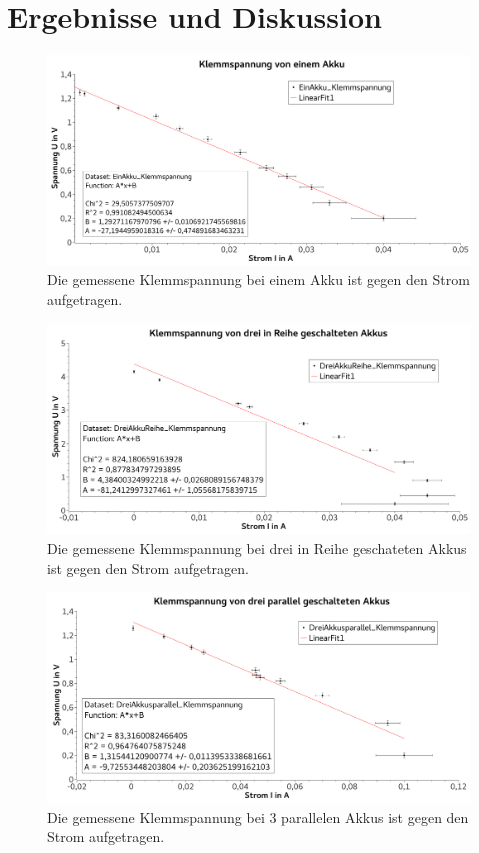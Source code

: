 \documentclass[
	a4paper,
	12pt,
	pagesize,
	ngerman
]{scrartcl}
\begin{document}
	\section{Ergebnisse und Diskussion}
	\begin{figure}[tb]
		\includegraphics[width=1\textwidth]{Spannung1}
		\centering
		\caption{Die gemessene Klemmspannung bei einem Akku ist gegen den Strom aufgetragen.}
		\label{Spannung1}
		\centering
	\end{figure}
	\begin{figure}[tb]
		\includegraphics[width=1\textwidth]{Spannung3Reihe}
		\centering
		\caption{Die gemessene Klemmspannung bei drei in Reihe geschateten Akkus ist gegen den Strom aufgetragen.}
		\label{Spannung3Reihe}
		\centering
	\end{figure}
	\begin{figure}[tb]
		\includegraphics[width=1\textwidth]{Spannung3Parallel}
		\centering
		\caption{Die gemessene Klemmspannung bei 3 parallelen Akkus ist gegen den Strom aufgetragen.}
		\label{Spannung3Parallel}
		\centering
	\end{figure}
\end{document}
